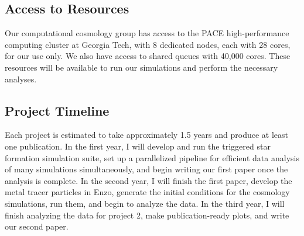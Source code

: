 \documentclass[letterpaper, 12pt]{article}
\begin{document}
\subsection*{Access to Resources}

Our computational cosmology group has access to the PACE high-performance computing cluster at Georgia Tech, with 8 dedicated nodes, each with 28 cores, for our use only. We also have access to shared queues with 40,000 cores. These resources will be available to run our simulations and perform the necessary analyses. 

\subsection*{Project Timeline}
Each project is estimated to take approximately 1.5 years and produce at least one publication. In the first year, I will develop and run the triggered star formation simulation suite, set up a parallelized pipeline for efficient data analysis of many simulations simultaneously, and begin writing our first paper once the analysis is complete. In the second year, I will finish the first paper, develop the metal tracer particles in Enzo, generate the initial conditions for the cosmology simulations, run them, and begin to analyze the data. In the third year, I will finish analyzing the data for project 2, make publication-ready plots, and write our second paper.
\end{document}
